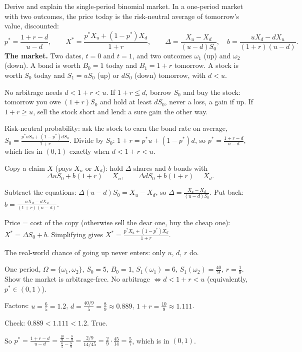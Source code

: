 \begin{problem}[Q5(a)]
Derive and explain the single-period binomial market.
\cardsays In a one-period market with two outcomes, the price today is the risk-neutral average of tomorrow's value, discounted:
\[
p^*=\frac{1+r-d}{u-d},\qquad X^*=\frac{p^*X_u+(1-p^*)X_d}{1+r},\qquad
\Delta=\frac{X_u-X_d}{(u-d)S_0},\quad b=\frac{uX_d-dX_u}{(1+r)(u-d)}.
\]
\textbf{The market.} Two dates, $t=0$ and $t=1$, and two outcomes $\omega_1$ (up) and $\omega_2$ (down). A bond is worth $B_0=1$ today and $B_1=1+r$ tomorrow. A stock is worth $S_0$ today and $S_1=uS_0$ (up) or $dS_0$ (down) tomorrow, with $d<u$.
\working
\begin{steps}
\item No arbitrage needs $d<1+r<u$. If $1+r\le d$, borrow $S_0$ and buy the stock: tomorrow you owe $(1+r)S_0$ and hold at least $dS_0$, never a loss, a gain if up. If $1+r\ge u$, sell the stock short and lend: a sure gain the other way.
\item Risk-neutral probability: ask the stock to earn the bond rate on average, $S_0=\frac{p^*uS_0+(1-p^*)dS_0}{1+r}$. Divide by $S_0$: $1+r=p^*u+(1-p^*)d$, so $p^*=\frac{1+r-d}{u-d}$, which lies in $(0,1)$ exactly when $d<1+r<u$.
\item Copy a claim $X$ (pays $X_u$ or $X_d$): hold $\Delta$ shares and $b$ bonds with
\[
\Delta uS_0+b(1+r)=X_u,\qquad\Delta dS_0+b(1+r)=X_d.
\]
\item Subtract the equations: $\Delta(u-d)S_0=X_u-X_d$, so $\Delta=\frac{X_u-X_d}{(u-d)S_0}$. Put back: $b=\frac{uX_d-dX_u}{(1+r)(u-d)}$.
\item Price = cost of the copy (otherwise sell the dear one, buy the cheap one): $X^*=\Delta S_0+b$. Simplifying gives $X^*=\frac{p^*X_u+(1-p^*)X_d}{1+r}$.
\item The real-world chance of going up never enters: only $u$, $d$, $r$ do.
\end{steps}
\end{problem}

\begin{problem}[Q5(b)(i)]
One period, $\Omega=\{\omega_1,\omega_2\}$, $S_0=5$, $B_0=1$, $S_1(\omega_1)=6$, $S_1(\omega_2)=\frac{40}9$, $r=\frac19$. Show the market is arbitrage-free.
\cardsays No arbitrage $\iff d<1+r<u$ (equivalently, $p^*\in(0,1)$).
\working
\begin{steps}
\item Factors: $u=\frac65=1.2$, $d=\frac{40/9}{5}=\frac89\approx0.889$, $1+r=\frac{10}9\approx1.111$.
\item Check: $0.889<1.111<1.2$. True.
\item So $p^*=\frac{1+r-d}{u-d}=\frac{\frac{10}9-\frac89}{\frac65-\frac89}=\frac{2/9}{14/45}=\frac{2}{9}\cdot\frac{45}{14}=\frac57$, which is in $(0,1)$.
\end{steps}
\end{problem}

